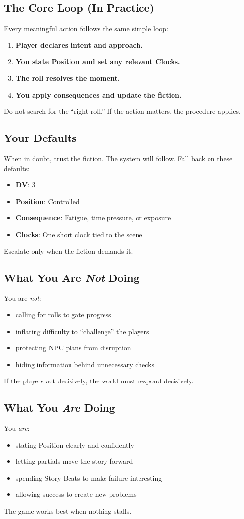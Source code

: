 \subsection{The Core Loop (In Practice)}
\label{subsec:gm-core-loop}
Every meaningful action follows the same simple loop:
\begin{enumerate}
\item \textbf{Player declares intent and approach.}
\item \textbf{You state Position and set any relevant Clocks.}
\item \textbf{The roll resolves the moment.}
\item \textbf{You apply consequences and update the fiction.}
\end{enumerate}
Do not search for the “right roll.” If the action matters, the procedure applies.

\subsection{Your Defaults}
\label{subsec:gm-defaults}
When in doubt, trust the fiction. The system will follow. Fall back on these defaults:
\begin{itemize}
\item \textbf{DV}: 3
\item \textbf{Position}: Controlled
\item \textbf{Consequence}: Fatigue, time pressure, or exposure
\item \textbf{Clocks}: One short clock tied to the scene
\end{itemize}
Escalate only when the fiction demands it.

\subsection{What You Are \emph{Not} Doing}
You are \emph{not}:
\begin{itemize}
\item calling for rolls to gate progress
\item inflating difficulty to “challenge” the players
\item protecting NPC plans from disruption
\item hiding information behind unnecessary checks
\end{itemize}
If the players act decisively, the world must respond decisively.

\subsection{What You \emph{Are} Doing}
You \emph{are}:
\begin{itemize}
\item stating Position clearly and confidently
\item letting partials move the story forward
\item spending Story Beats to make failure interesting
\item allowing success to create new problems
\end{itemize}
The game works best when nothing stalls.

